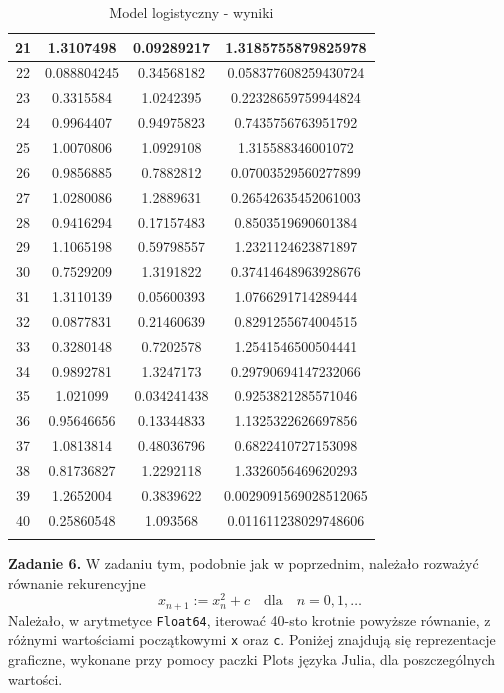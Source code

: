 \documentclass[15pt, a4paper]{article}
\begin{document}
\begin{longtable}{|c|c|c|c|}
        21 & 1.3107498 & 0.09289217 & 1.3185755879825978 \\ \hline
        22 & 0.088804245 & 0.34568182 & 0.058377608259430724 \\ \hline
        23 & 0.3315584 & 1.0242395 & 0.22328659759944824 \\ \hline
        24 & 0.9964407 & 0.94975823 & 0.7435756763951792 \\ \hline
        25 & 1.0070806 & 1.0929108 & 1.315588346001072 \\ \hline
        26 & 0.9856885 & 0.7882812 & 0.07003529560277899 \\ \hline
        27 & 1.0280086 & 1.2889631 & 0.26542635452061003 \\ \hline
        28 & 0.9416294 & 0.17157483 & 0.8503519690601384 \\ \hline
        29 & 1.1065198 & 0.59798557 & 1.2321124623871897 \\ \hline
        30 & 0.7529209 & 1.3191822 & 0.37414648963928676 \\ \hline
        31 & 1.3110139 & 0.05600393 & 1.0766291714289444 \\ \hline
        32 & 0.0877831 & 0.21460639 & 0.8291255674004515 \\ \hline
        33 & 0.3280148 & 0.7202578 & 1.2541546500504441 \\ \hline
        34 & 0.9892781 & 1.3247173 & 0.29790694147232066 \\ \hline
        35 & 1.021099 & 0.034241438 & 0.9253821285571046 \\ \hline
        36 & 0.95646656 & 0.13344833 & 1.1325322626697856 \\ \hline
        37 & 1.0813814 & 0.48036796 & 0.6822410727153098 \\ \hline
        38 & 0.81736827 & 1.2292118 & 1.3326056469620293 \\ \hline
        39 & 1.2652004 & 0.3839622 & 0.0029091569028512065 \\ \hline
        40 & 0.25860548 & 1.093568 & 0.011611238029748606 \\ \hline
    \caption{Model logistyczny - wyniki}
\end{longtable}

\vspace{0.5cm}

\noindent\hrulefill

 
\vspace{0.5cm}


\noindent\textbf{Zadanie 6.} W zadaniu tym, podobnie jak w poprzednim, należało rozważyć równanie rekurencyjne  
\[
    x_{n+1} := x_n^2 + c \quad \mathrm{dla} \quad n = 0, 1, \ldots
\]
Należało, w arytmetyce \verb|Float64|, iterować 40-sto krotnie powyższe równanie, z różnymi wartościami początkowymi \verb|x| oraz \verb|c|. Poniżej znajdują się reprezentacje graficzne, wykonane przy pomocy paczki Plots języka Julia, dla poszczególnych wartości.
\end{document}
